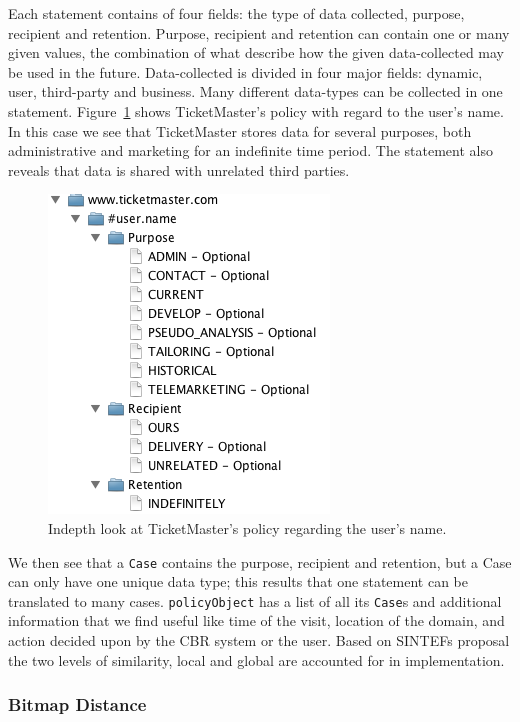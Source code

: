 Each statement contains of four fields: the type of data collected, purpose, recipient and retention. Purpose, recipient and retention can contain one or many given values, the combination of what describe how the given data-collected may be used in the future. Data-collected is divided in four major fields: dynamic, user, third-party and business. Many different data-types can be collected in one statement. Figure~\ref{p3pNameField} shows TicketMaster's policy with regard to the user's name. In this case we see that TicketMaster stores data for several purposes, both administrative and marketing for an indefinite time period. The statement also reveals that data is shared with unrelated third parties.

\begin{figure}[htbp]
\begin{center}
\includegraphics{Implementation/p3p_fields}
\caption{Indepth look at TicketMaster's policy regarding the user's name.}
\label{p3pNameField}
\end{center}
\end{figure}


We then see that a \texttt{Case} contains the purpose, recipient and retention, but a Case can only have one unique data type; this results that one statement can be translated to many cases. \texttt{policyObject} has a list of all its \texttt{Case}s and additional information that we find useful like time of the visit, location of the domain, and action decided upon by the CBR system or the user. Based on SINTEFs proposal the two levels of similarity, local and global are accounted for in implementation. 

\subsubsection{Bitmap Distance}

